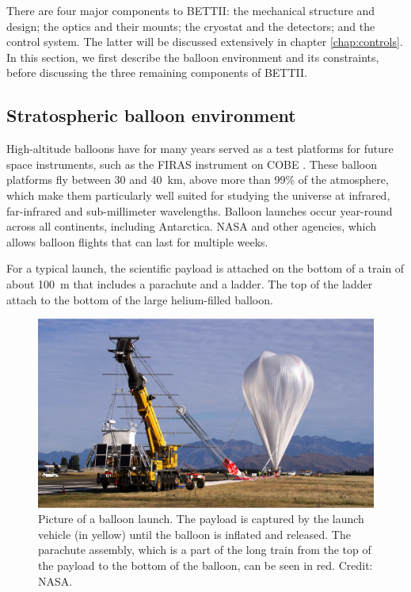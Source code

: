 There are four major components to BETTII: the mechanical structure and design; the optics and their mounts; the cryostat and the detectors; and the control system. The latter will be discussed extensively in chapter \ref{chap:controls}. In this section, we first describe the balloon environment and its constraints, before discussing the three remaining components of BETTII. 

\subsection{Stratospheric balloon environment}

High-altitude balloons have for many years served as a test platforms for future space instruments, such as the FIRAS instrument on COBE \citep{Fixsen:2002jv}. These balloon platforms fly between 30 and \SI{40}{\kilo\meter}, above more than 99\% of the atmosphere, which make them particularly well suited for studying the universe at infrared, far-infrared and sub-millimeter wavelengths. Balloon launches occur year-round across all continents, including Antarctica. NASA and other agencies, which allows balloon flights that can last for multiple weeks. 

For a typical launch, the scientific payload is attached on the bottom of a train of about \SI{100}{\meter} that includes a parachute and a ladder. The top of the ladder attach to the bottom of the large helium-filled balloon. 
\begin{figure}[!ht]
	\centering
	\includegraphics[width=\textwidth]{Figures/balloonLaunch.png} 
	\caption[Balloon launch]{Picture of a balloon launch. The payload is captured by the launch vehicle (in yellow) until the balloon is inflated and released. The parachute assembly, which is a part of the long train from the top of the payload to the bottom of the balloon, can be seen in red. Credit: NASA.}
	\label{fig:BalloonLaunch}
    \end{figure}





